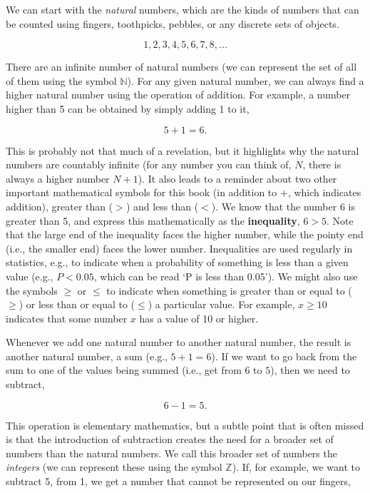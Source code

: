 \documentclass[
  openany]{scrbook}
\begin{document}
We can start with the \emph{natural} numbers, which are the kinds of numbers that can be counted using fingers, toothpicks, pebbles, or any discrete sets of objects.

\[1, 2, 3, 4, 5, 6, 7, 8, ...\]

There are an infinite number of natural numbers (we can represent the set of all of them using the symbol \(\mathbb{N}\)).
For any given natural number, we can always find a higher natural number using the operation of addition.
For example, a number higher than 5 can be obtained by simply adding 1 to it,

\[5 + 1 = 6.\]

This is probably not that much of a revelation, but it highlights why the natural numbers are countably infinite (for any number you can think of, \(N\), there is always a higher number \(N + 1\)).
It also leads to a reminder about two other important mathematical symbols for this book (in addition to \(+\), which indicates addition), greater than (\(>\)) and less than (\(<\)).
We know that the number 6 is greater than 5, and express this mathematically as the \textbf{inequality}, \(6 > 5\).
Note that the large end of the inequality faces the higher number, while the pointy end (i.e., the smaller end) faces the lower number.
Inequalities are used regularly in statistics, e.g., to indicate when a probability of something is less than a given value (e.g., \(P < 0.05\), which can be read `P is less than 0.05').
We might also use the symbols \(\geq\) or \(\leq\) to indicate when something is greater than or equal to (\(\geq\)) or less than or equal to (\(\leq\)) a particular value.
For example, \(x \geq 10\) indicates that some number \(x\) has a value of 10 or higher.

Whenever we add one natural number to another natural number, the result is another natural number, a sum (e.g., \(5 + 1 = 6\)).
If we want to go back from the sum to one of the values being summed (i.e., get from \(6\) to \(5\)), then we need to subtract,

\[6 - 1 = 5.\]

This operation is elementary mathematics, but a subtle point that is often missed is that the introduction of subtraction creates the need for a broader set of numbers than the natural numbers.
We call this broader set of numbers the \emph{integers} (we can represent these using the symbol \(\mathbb{Z}\)).
If, for example, we want to subtract 5, from 1, we get a number that cannot be represented on our fingers,
\end{document}

